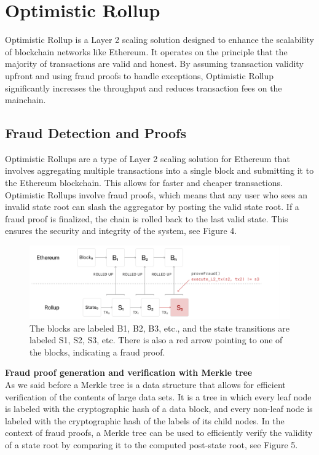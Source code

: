 \documentclass{report}
\begin{document}
\section{Optimistic Rollup}
Optimistic Rollup is a Layer 2 scaling solution designed to enhance the scalability of blockchain networks like Ethereum. It operates on the principle that the majority of transactions are valid and honest. By assuming transaction validity upfront and using fraud proofs to handle exceptions, Optimistic Rollup significantly increases the throughput and reduces transaction fees on the mainchain.
\subsection{Fraud Detection and Proofs}
Optimistic Rollups are a type of Layer 2 scaling solution for Ethereum that involves aggregating multiple transactions into a single block and submitting it to the Ethereum blockchain. This allows for faster and cheaper transactions.\\
Optimistic Rollups involve fraud proofs, which means that any user who sees an invalid state root can slash the aggregator by posting the valid state root. If a fraud proof is finalized, the chain is rolled back to the last valid state. This ensures the security and integrity of the system, see Figure 4.\\
\begin{center}
	\begin{figure}
		\centering
		\includegraphics[width=0.8\linewidth]{Fig/F4}
		\caption{The blocks are labeled B1, B2, B3, etc., and the state transitions are labeled S1, S2, S3, etc. There is also a red arrow pointing to one of the blocks, indicating a fraud proof.
		}
		\label{fig:f1}
	\end{figure}
\end{center}
\textbf{Fraud proof generation and verification with Merkle tree}\\ As we said before a Merkle tree is a data structure that allows for efficient verification of the contents of large data sets. It is a tree in which every leaf node is labeled with the cryptographic hash of a data block, and every non-leaf node is labeled with the cryptographic hash of the labels of its child nodes. In the context of fraud proofs, a Merkle tree can be used to efficiently verify the validity of a state root by comparing it to the computed post-state root, see Figure 5.
\end{document}
